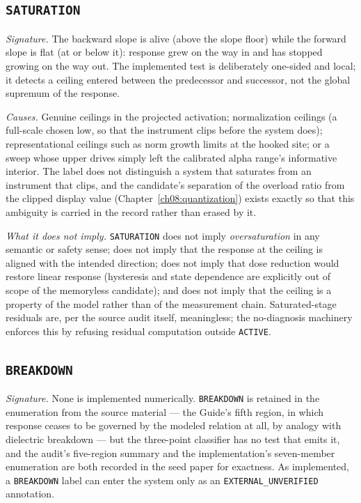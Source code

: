 \subsection{\texttt{SATURATION}}\label{ch07:sec:region-saturation}

\emph{Signature.} The backward slope is alive (above the slope floor) while
the forward slope is flat (at or below it): response grew on the way in and
has stopped growing on the way out. The implemented test is deliberately
one-sided and local; it detects a ceiling entered between the predecessor and
successor, not the global supremum of the response.

\emph{Causes.} Genuine ceilings in the projected activation; normalization
ceilings (a full-scale chosen low, so that the instrument clips before the
system does); representational ceilings such as norm growth limits at the
hooked site; or a sweep whose upper drives simply left the calibrated alpha
range's informative interior. The label does not distinguish a system that
saturates from an instrument that clips, and the candidate's separation of
the overload ratio from the clipped display value
(Chapter~\ref{ch08:quantization}) exists exactly so that this ambiguity is
carried in the record rather than erased by it.

\emph{What it does not imply.} \texttt{SATURATION} does not imply
\emph{oversaturation} in any semantic or safety sense; does not imply that
the response at the ceiling is aligned with the intended direction; does not
imply that dose reduction would restore linear response (hysteresis and state
dependence are explicitly out of scope of the memoryless candidate); and does
not imply that the ceiling is a property of the model rather than of the
measurement chain. Saturated-stage residuals are, per the source audit
itself, meaningless; the no-diagnosis machinery enforces this by refusing
residual computation outside \texttt{ACTIVE}.

\subsection{\texttt{BREAKDOWN}}\label{ch07:sec:region-breakdown}

\emph{Signature.} None is implemented numerically. \texttt{BREAKDOWN} is
retained in the enumeration from the source material --- the Guide's fifth
region, in which response ceases to be governed by the modeled relation at
all, by analogy with dielectric breakdown --- but the three-point classifier
has no test that emits it, and the audit's five-region summary and the
implementation's seven-member enumeration are both recorded in the seed paper
for exactness. As implemented, a \texttt{BREAKDOWN} label can enter the
system only as an \texttt{EXTERNAL\_UNVERIFIED} annotation.

